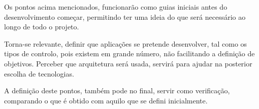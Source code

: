 	Os pontos acima mencionados, funcionarão como guias iniciais antes do desenvolvimento começar, permitindo ter uma ideia do que será necessário ao longo de todo o projeto.

	Torna-se relevante, definir que aplicações se pretende desenvolver, tal como os tipos de controlo, pois existem em grande número, não facilitando a definição de objetivos. Perceber que arquitetura será usada, servirá para ajudar na posterior escolha de tecnologias.

	A definição deste pontos, também pode no final, servir como verificação, comparando o que é obtido com aquilo que se defini inicialmente.


